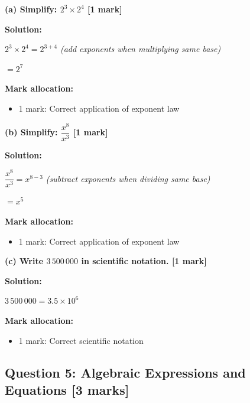\documentclass[12pt,a4paper]{article}
\begin{document}
\textbf{(a) Simplify: $2^3 \times 2^4$ \hfill [1 mark]}

\vspace{0.2cm}
\noindent\textbf{Solution:}

$2^3 \times 2^4 = 2^{3+4}$ \checkmark \quad \textit{(add exponents when multiplying same base)}

$= 2^7$

\vspace{0.3cm}
\noindent\textbf{Mark allocation:}
\begin{itemize}
    \item 1 mark: Correct application of exponent law
\end{itemize}

\vspace{0.4cm}

\textbf{(b) Simplify: $\dfrac{x^8}{x^3}$ \hfill [1 mark]}

\vspace{0.2cm}
\noindent\textbf{Solution:}

$\dfrac{x^8}{x^3} = x^{8-3}$ \checkmark \quad \textit{(subtract exponents when dividing same base)}

$= x^5$

\vspace{0.3cm}
\noindent\textbf{Mark allocation:}
\begin{itemize}
    \item 1 mark: Correct application of exponent law
\end{itemize}

\vspace{0.4cm}

\textbf{(c) Write $3\,500\,000$ in scientific notation. \hfill [1 mark]}

\vspace{0.2cm}
\noindent\textbf{Solution:}

$3\,500\,000 = 3.5 \times 10^6$ \checkmark

\vspace{0.3cm}
\noindent\textbf{Mark allocation:}
\begin{itemize}
    \item 1 mark: Correct scientific notation
\end{itemize}

\subsection*{Question 5: Algebraic Expressions and Equations [3 marks]}
\end{document}

